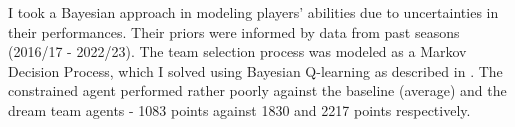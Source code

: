 I took a Bayesian approach in modeling players' abilities due to uncertainties in their performances. Their priors were informed by data from past seasons (2016/17 - 2022/23). The team selection process was modeled as a Markov Decision Process, which I solved using Bayesian Q-learning as described in \cite{matthews2012}. The constrained agent performed rather poorly against the baseline (average) and the dream team agents - 1083 points against 1830 and 2217 points respectively.